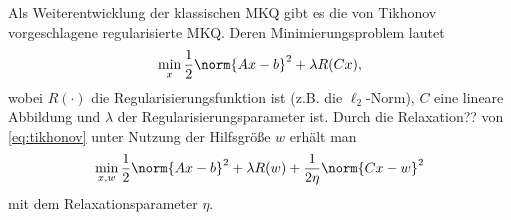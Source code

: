 Als Weiterentwicklung der klassischen MKQ gibt es die von Tikhonov vorgeschlagene regularisierte MKQ. Deren Minimierungsproblem lautet
\begin{equation}
\min_x \frac{1}{2}\norm{Ax-b}^2+\lambda R(Cx), \label{eq:tikhonov}
\end{equation}
wobei $R(\cdot)$ die Regularisierungsfunktion ist (z.B. die $\ell_2$-Norm), $C$ eine lineare Abbildung und $\lambda$ der Regularisierungsparameter ist. Durch die Relaxation?? von \ref{eq:tikhonov} unter Nutzung der Hilfsgröße $w$ erhält man 
\begin{equation}
\min_{x,w} \frac{1}{2}\norm{Ax-b}^2+\lambda R(w) + \frac{1}{2\eta} \norm{Cx-w}^2
\end{equation}
mit dem Relaxationsparameter $\eta$.
